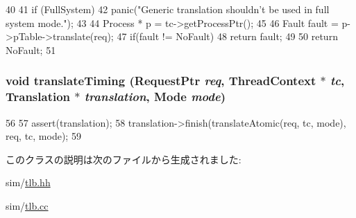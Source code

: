 \begin{DoxyCode}
40 {
41     if (FullSystem)
42         panic("Generic translation shouldn't be used in full system mode.\n");
43 
44     Process * p = tc->getProcessPtr();
45 
46     Fault fault = p->pTable->translate(req);
47     if(fault != NoFault)
48         return fault;
49 
50     return NoFault;
51 }
\end{DoxyCode}
\hypertarget{classGenericTLB_ae52f7e465748883695d2b4f432a13652}{
\subsubsection[{translateTiming}]{\setlength{\rightskip}{0pt plus 5cm}void translateTiming ({\bf RequestPtr} {\em req}, \/  {\bf ThreadContext} $\ast$ {\em tc}, \/  {\bf Translation} $\ast$ {\em translation}, \/  {\bf Mode} {\em mode})}}
\label{classGenericTLB_ae52f7e465748883695d2b4f432a13652}



\begin{DoxyCode}
56 {
57     assert(translation);
58     translation->finish(translateAtomic(req, tc, mode), req, tc, mode);
59 }
\end{DoxyCode}


このクラスの説明は次のファイルから生成されました:\begin{DoxyCompactItemize}
\item 
sim/\hyperlink{sim_2tlb_8hh}{tlb.hh}\item 
sim/\hyperlink{sim_2tlb_8cc}{tlb.cc}\end{DoxyCompactItemize}
